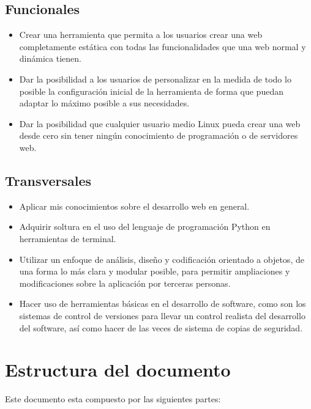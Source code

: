 \subsection{Funcionales}
\begin{itemize}
\item Crear una herramienta que permita a los usuarios crear una web completamente estática
con todas las funcionalidades que una web normal y dinámica tienen.
\item Dar la posibilidad a los usuarios de personalizar en la medida de todo lo posible la configuración
inicial de la herramienta de forma que puedan adaptar lo máximo posible a sus necesidades.
\item Dar la posibilidad que cualquier usuario medio Linux pueda crear una web desde cero sin tener
ningún conocimiento de programación o de servidores web.
\end{itemize}

\subsection{Transversales}
\begin{itemize}
\item Aplicar mis conocimientos sobre el desarrollo web en general.
\item Adquirir soltura en el uso del lenguaje de programación Python en herramientas de terminal.
\item Utilizar un enfoque de análisis, diseño y codificación orientado a objetos,
de una forma lo más clara y modular posible, para permitir ampliaciones y
modificaciones sobre la aplicación por terceras personas.
\item Hacer uso de herramientas básicas en el desarrollo de software, como son los
sistemas de control de versiones para llevar un control realista del desarrollo
del software, así como hacer de las veces de sistema de copias de seguridad.
\end{itemize}

\section{Estructura del documento}

Este documento esta compuesto por las siguientes partes:

